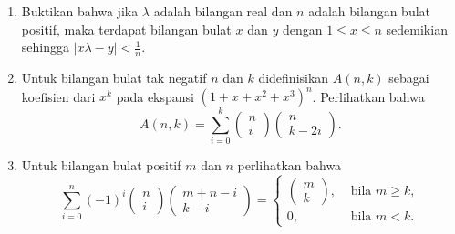 \documentclass[12pt,twoside]{article}
\begin{document}
\begin{enumerate}
	\item Buktikan bahwa jika $\lambda$ adalah bilangan real dan $n$ adalah bilangan bulat positif, maka terdapat bilangan bulat $x$ dan $y$ dengan $1\leq x\leq n$ sedemikian sehingga $|x\lambda-y|< \frac{1}{n}$.
	\item Untuk bilangan bulat tak negatif $n$ dan $k$ didefinisikan $A(n,k)$ sebagai koefisien dari $x^k$ pada ekspansi $(1+x+x^2+x^3)^n$. Perlihatkan bahwa
	      \begin{equation*}
		      A(n,k)=\sum_{i=0}^k \begin{pmatrix}
			      n \\i
		      \end{pmatrix}\begin{pmatrix}
			      n \\k-2i
		      \end{pmatrix}.
	      \end{equation*}
	\item Untuk bilangan bulat positif $m$ dan $n$ perlihatkan bahwa
	      \begin{equation*}
		      \sum_{i=0}^n (-1)^i\begin{pmatrix}
			      n \\i
		      \end{pmatrix}\begin{pmatrix}
			      m+n-i \\k-i
		      \end{pmatrix}=\begin{cases}
			      \begin{pmatrix}
				      m \\k
			      \end{pmatrix}, & \text{ bila } m\geq k, \\
			      0,              & \text{ bila } m<k.
		      \end{cases}
	      \end{equation*}
\end{enumerate}
\newpage
\end{document}
